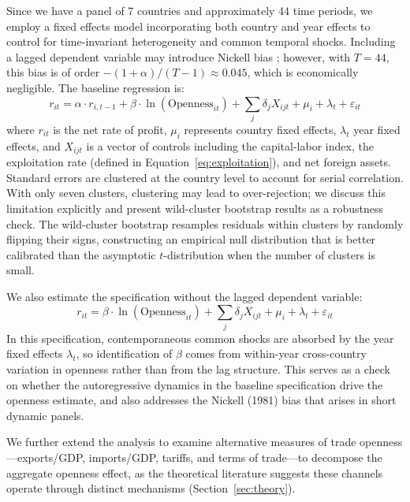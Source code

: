 \documentclass[10pt]{article}
\begin{document}
Since we have a panel of 7 countries and approximately 44 time periods, we employ a fixed effects model incorporating both country and year effects to control for time-invariant heterogeneity and common temporal shocks. Including a lagged dependent variable may introduce Nickell bias \citep{Nickell1981}; however, with $T = 44$, this bias is of order $-(1+\alpha)/(T-1) \approx 0.045$, which is economically negligible. The baseline regression is:
\begin{equation}
r_{it} = \alpha \cdot r_{i,t-1} + \beta \cdot \ln(\text{Openness}_{it}) + \sum_{j} \delta_j X_{ijt} + \mu_i + \lambda_t + \varepsilon_{it}
\label{eq:twfe}
\end{equation}
where $r_{it}$ is the net rate of profit, $\mu_i$ represents country fixed effects, $\lambda_t$ year fixed effects, and $X_{ijt}$ is a vector of controls including the capital-labor index, the exploitation rate (defined in Equation~\ref{eq:exploitation}), and net foreign assets. Standard errors are clustered at the country level to account for serial correlation. With only seven clusters, clustering may lead to over-rejection; we discuss this limitation explicitly and present wild-cluster bootstrap results as a robustness check. The wild-cluster bootstrap \citep{cameronmillerguide2015} resamples residuals within clusters by randomly flipping their signs, constructing an empirical null distribution that is better calibrated than the asymptotic $t$-distribution when the number of clusters is small.

\par We also estimate the specification without the lagged dependent variable:
\begin{equation}
r_{it} = \beta \cdot \ln(\text{Openness}_{it}) + \sum_{j} \delta_j X_{ijt} + \mu_i + \lambda_t + \varepsilon_{it}
\label{eq:twfe_nlag}
\end{equation}
In this specification, contemporaneous common shocks are absorbed by the year fixed effects $\lambda_t$, so identification of $\beta$ comes from within-year cross-country variation in openness rather than from the lag structure. This serves as a check on whether the autoregressive dynamics in the baseline specification drive the openness estimate, and also addresses the Nickell (1981) bias that arises in short dynamic panels.

\par We further extend the analysis to examine alternative measures of trade openness---exports/GDP, imports/GDP, tariffs, and terms of trade---to decompose the aggregate openness effect, as the theoretical literature suggests these channels operate through distinct mechanisms (Section~\ref{sec:theory}).
\end{document}
